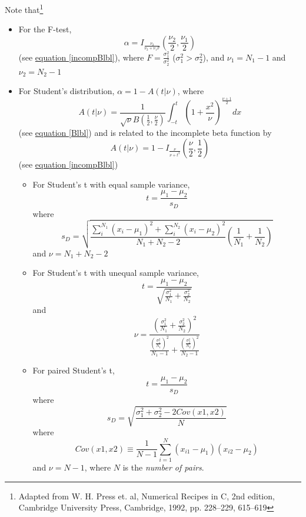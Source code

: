 \documentclass{report}
\begin{document}
Note that\footnote{Adapted from W. H. Press et. al, Numerical
Recipes in C, 2nd edition, Cambridge University Press, Cambridge,
1992, pp. 228--229, 615--619}
\begin{itemize}
\item For the F-test,
\begin{equation}
\alpha = I_{\frac{\nu_2}{\nu_2+\nu_1 F}}
(\frac{\nu_2}{2},\frac{\nu_1}{2})
\end{equation}
      (see \hyperref[incompBlbl]{equation \ref{incompBlbl}}), where
      $F = \frac{\sigma_1^2}{\sigma_2^2}$ ($\sigma_1^2 > \sigma_2^2$),
      and $\nu_1 = N_1 - 1$ and $\nu_2 = N_2 - 1$
\item For Student's distribution, $\alpha=1-A(t|\nu)$, where
\begin{equation}
A(t|\nu)=\frac{1}{\sqrt{\nu}B(\frac{1}{2},\frac{\nu}{2})}
\int_{-t}^t(1+\frac{x^2}{\nu})^{\frac{\nu+1}{2}}dx
\end{equation}
      (see \hyperref[Blbl]{equation \ref{Blbl}}) and is related to the
      incomplete beta function by
 \begin{equation}
A(t|\nu)=1-I_{\frac{\nu}{\nu+t^2}} (\frac{\nu}{2},\frac{1}{2})
\end{equation}
      (see \hyperref[incompBlbl]{equation \ref{incompBlbl}})
\begin{itemize}
\item For Student's t with equal sample variance,
\begin{equation}
t = \frac{\mu_1-\mu_2}{s_D}
\end{equation}
where
\begin{equation}
s_D=\sqrt{\frac{\sum_{i}^{N_1}(x_i-\mu_1)^2+\sum_{i}^{N_2}(x_i-\mu_2)^
2}
{N_1+N_2-2}\left(\frac{1}{N_1}+\frac{1}{N_2}\right)}
\end{equation}
      and $\nu=N_1+N_2-2$
\item For Student's t with unequal sample variance,
\begin{equation}
t=\frac{\mu_1-\mu_2}{\sqrt{\frac{\sigma_1^2}{N_1}+\frac{\sigma_2^2}{
N_2}}}
\end{equation}
and
\begin{equation}
\nu=\frac{\left(\frac{\sigma_1^2}{N_1}+\frac{\sigma_2^2}{N_2}\right)^2
}
{\frac{\left(\frac{\sigma_1^2}{N_1}\right)^2}{N_1-1}+
\frac{\left(\frac{\sigma_2^2}{N_2}\right)^2}{N_2-1}}
\end{equation}
\item For paired Student's t,
\begin{equation}
t = \frac{\mu_1-\mu_2}{s_D}
\end{equation}
where
\begin{equation}
s_D=\sqrt{\frac{\sigma_1^2+\sigma_2^2-2Cov(x1,x2)}{N}}
\end{equation}
where
\begin{equation}
Cov(x1,x2) \equiv \frac{1}{N-1}\sum_{i=1}^{N}(x_{i1}-\mu_1)(x_{i2}-
\mu_2)
\end{equation}
      and $\nu=N-1$, where $N$ is the {\em number of pairs}.
\end{itemize}
\end{itemize}
\end{document}
